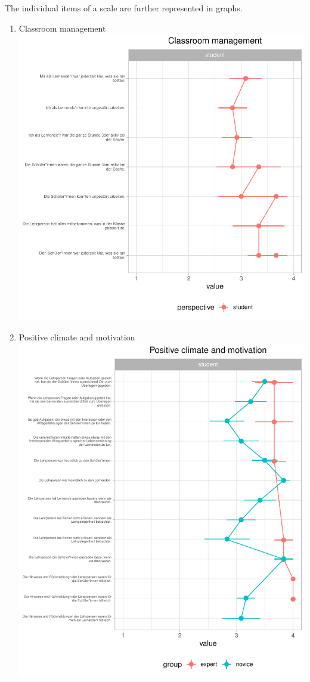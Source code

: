 \documentclass[
  english,
  man,floatsintext]{apa6}
\providecommand{\tightlist}{%
  \setlength{\itemsep}{0pt}\setlength{\parskip}{0pt}}
\begin{document}
\newpage

The individual items of a scale are further represented in graphs.

\begin{enumerate}
\def\labelenumi{(\arabic{enumi})}
\tightlist
\item
  Classroom management
  \includegraphics{paper_1_supplement_new_table_files/figure-latex/Line Plots Classroom Management-1.pdf}
  \newpage
\item
  Positive climate and motivation
  \includegraphics{paper_1_supplement_new_table_files/figure-latex/Positive climate and motivation line plots-1.pdf}

\end{enumerate}
\end{document}
